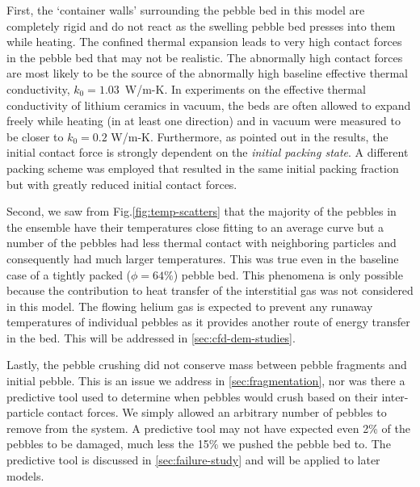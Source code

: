 First, the `container walls' surrounding the pebble bed in this model are completely rigid and do not react as the swelling pebble bed presses into them while heating. The confined thermal expansion leads to very high contact forces in the pebble bed that may not be realistic. The abnormally high contact forces are most likely to be the source of the abnormally high baseline effective thermal conductivity, $k_0 = 1.03$~W/m-K. In experiments on the effective thermal conductivity of lithium ceramics in vacuum, the beds are often allowed to expand freely while heating (in at least one direction) and in vacuum were measured to be closer to $k_0 = 0.2$ W/m-K.\cite{Abou-Sena2005} Furthermore, as pointed out in the results, the initial contact force is strongly dependent on the \textit{initial packing state}. A different packing scheme was employed that resulted in the same initial packing fraction but with greatly reduced initial contact forces. 

Second, we saw from Fig.\ref{fig:temp-scatters} that the majority of the pebbles in the ensemble have their temperatures close fitting to an average curve but a number of the pebbles had less thermal contact with neighboring particles and consequently had much larger temperatures. This was true even in the baseline case of a tightly packed ($\phi = 64\%$) pebble bed. This phenomena is only possible because the contribution to heat transfer of the interstitial gas was not considered in this model. The flowing helium gas is expected to prevent any runaway temperatures of individual pebbles as it provides another route of energy transfer in the bed. This will be addressed in \cref{sec:cfd-dem-studies}.

Lastly, the pebble crushing did not conserve mass between pebble fragments and initial pebble. This is an issue we address in \cref{sec:fragmentation}, nor was there a predictive tool used to determine when pebbles would crush based on their inter-particle contact forces. We simply allowed an arbitrary number of pebbles to remove from the system. A predictive tool may not have expected even 2\% of the pebbles to be damaged, much less the 15\% we pushed the pebble bed to. The predictive tool is discussed in \cref{sec:failure-study} and will be applied to later models.

